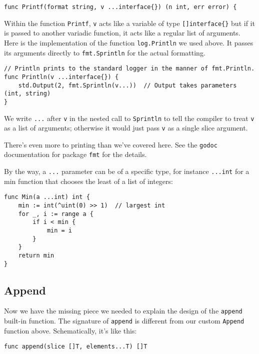 \begin{Verbatim}[frame=single]
func Printf(format string, v ...interface{}) (n int, err error) {
\end{Verbatim}

Within the function \texttt{Printf}, \texttt{v} acts like a variable of
type \texttt{{[}{]}interface\{\}} but if it is passed to another
variadic function, it acts like a regular list of arguments. Here is the
implementation of the function \texttt{log.Println} we used above. It
passes its arguments directly to \texttt{fmt.Sprintln} for the actual
formatting.

\begin{Verbatim}[frame=single]
// Println prints to the standard logger in the manner of fmt.Println.
func Println(v ...interface{}) {
    std.Output(2, fmt.Sprintln(v...))  // Output takes parameters (int, string)
}
\end{Verbatim}

We write \texttt{...} after \texttt{v} in the nested call to
\texttt{Sprintln} to tell the compiler to treat \texttt{v} as a list of
arguments; otherwise it would just pass \texttt{v} as a single slice
argument.

There's even more to printing than we've covered here. See the
\texttt{godoc} documentation for package \texttt{fmt} for the details.

By the way, a \texttt{...} parameter can be of a specific type, for
instance \texttt{...int} for a min function that chooses the least of a
list of integers:

\begin{Verbatim}[frame=single]
func Min(a ...int) int {
    min := int(^uint(0) >> 1)  // largest int
    for _, i := range a {
        if i < min {
            min = i
        }
    }
    return min
}
\end{Verbatim}

\subsection*{Append}

Now we have the missing piece we needed to explain the design of the
\texttt{append} built-in function. The signature of \texttt{append} is
different from our custom \texttt{Append} function above. Schematically,
it's like this:

\begin{Verbatim}[frame=single]
func append(slice []T, elements...T) []T
\end{Verbatim}

